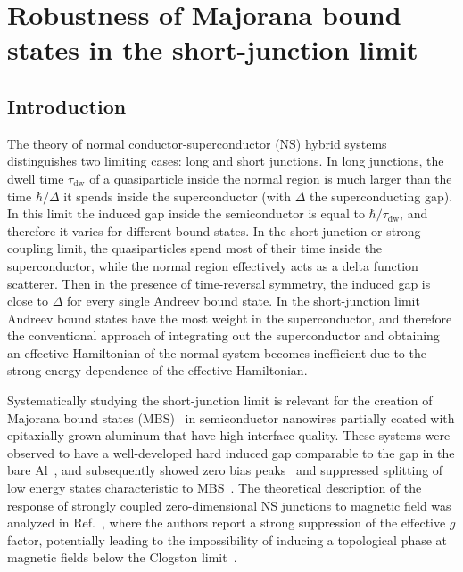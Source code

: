 \chapter{Robustness of Majorana bound states in the short-junction limit}
\label{ch:shortjunction}

\newpage
\noindent

\section{Introduction}
The theory of normal conductor-superconductor (NS) hybrid systems distinguishes two limiting cases: long and short junctions.
In long junctions, the dwell time $\tau_\textrm{dw}$ of a quasiparticle inside the normal region is much larger than the time $\hbar/\Delta$ it spends inside the superconductor (with $\Delta$ the superconducting gap).
In this limit the induced gap inside the semiconductor is equal to $\hbar/\tau_{\textrm{dw}}$, and therefore it varies for different bound states.
In the short-junction or strong-coupling limit, the quasiparticles spend most of their time inside the superconductor, while the normal region effectively acts as a delta function scatterer.
Then in the presence of time-reversal symmetry, the induced gap is close to $\Delta$ for every single Andreev bound state.
In the short-junction limit Andreev bound states have the most weight in the superconductor, and therefore the conventional approach of integrating out the superconductor and obtaining an effective Hamiltonian of the normal system becomes inefficient due to the strong energy dependence of the effective Hamiltonian.

Systematically studying the short-junction limit is relevant for the creation of Majorana bound states (MBS)~\cite{Qi2011, Leijnse2012, Alicea2012, Beenakker2013, Elliott2015} in semiconductor nanowires\cite{Lutchyn2010, Oreg2010} partially coated with epitaxially grown aluminum that have high interface quality.
These systems were observed to have a well-developed hard induced gap comparable to the gap in the bare Al~\cite{Chang2015}, and subsequently showed zero bias peaks~\cite{Deng2016} and suppressed splitting of low energy states characteristic to MBS~\cite{Albrecht2016}.
The theoretical description of the response of strongly coupled zero-dimensional NS junctions to magnetic field was analyzed in Ref.~\cite{Cole2015}, where the authors report a strong suppression of the effective $g$ factor, potentially leading to the impossibility of inducing a topological phase at magnetic fields below the Clogston limit~\cite{Clogston1962}.


